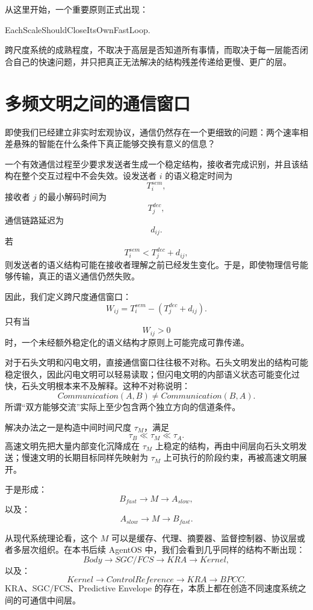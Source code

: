 从这里开始，一个重要原则正式出现：

\begin{statementbox}
EachScaleShouldCloseItsOwnFastLoop.
\end{statementbox}

跨尺度系统的成熟程度，不取决于高层是否知道所有事情，而取决于每一层能否闭合自己的快速问题，并只把真正无法解决的结构残差传递给更慢、更广的层。


\section{多频文明之间的通信窗口}

即使我们已经建立非实时宏观协议，通信仍然存在一个更细致的问题：两个速率相差悬殊的智能在什么条件下真正能够交换有意义的信息？

一个有效通信过程至少要求发送者生成一个稳定结构，接收者完成识别，并且该结构在整个交互过程中不会失效。设发送者 $i$ 的语义稳定时间为
\[
T_i^{sem},
\]
接收者 $j$ 的最小解码时间为
\[
T_j^{dec},
\]
通信链路延迟为
\[
d_{ij}.
\]
若
\[
T_i^{sem}
<
T_j^{dec}+d_{ij},
\]
则发送者的语义结构可能在接收者理解之前已经发生变化。于是，即使物理信号能够传输，真正的语义通信仍然失败。

因此，我们定义跨尺度通信窗口：
\[
W_{ij}
=
T_i^{sem}
-
(T_j^{dec}+d_{ij}).
\]
只有当
\[
W_{ij}>0
\]
时，一个未经额外稳定化的语义结构才原则上可能完成可靠传递。

对于石头文明和闪电文明，直接通信窗口往往极不对称。石头文明发出的结构可能稳定很久，因此闪电文明可以轻易读取；但闪电文明的内部语义状态可能变化过快，石头文明根本来不及解释。这种不对称说明：
\[
Communication(A,B)
\neq
Communication(B,A).
\]
所谓“双方能够交流”实际上至少包含两个独立方向的信道条件。

解决办法之一是构造中间时间尺度 $\tau_M$，满足
\[
\tau_B
\ll
\tau_M
\ll
\tau_A.
\]
高速文明先把大量内部变化沉降成在 $\tau_M$ 上稳定的结构，再由中间层向石头文明发送；慢速文明的长期目标同样先映射为 $\tau_M$ 上可执行的阶段约束，再被高速文明展开。

于是形成：
\[
B_{fast}
\rightarrow
M
\rightarrow
A_{slow},
\]
以及：
\[
A_{slow}
\rightarrow
M
\rightarrow
B_{fast}.
\]

从现代系统理论看，这个 $M$ 可以是缓存、代理、摘要器、监督控制器、协议层或者多层次组织。在本书后续 AgentOS 中，我们会看到几乎同样的结构不断出现：
\[
Body
\rightarrow
SGC/FCS
\rightarrow
KRA
\rightarrow
Kernel,
\]
以及：
\[
Kernel
\rightarrow
ControlReference
\rightarrow
KRA
\rightarrow
BPCC.
\]
KRA、SGC/FCS、Predictive Envelope 的存在，本质上都在创造不同速度系统之间的可通信中间层。

